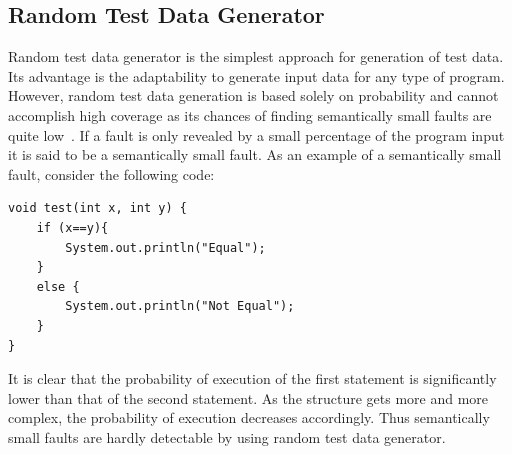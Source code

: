 \subsection{Random Test Data Generator}
\label{sec:randomgenerator_2}
Random test data generator is the simplest approach for generation of test data. Its advantage is the adaptability to generate input data for any type of program. However, random test data generation is based solely on probability and cannot accomplish high coverage as its chances of finding semantically small faults are quite low~\cite{godefroid2005dart}. If a fault is only revealed by a small percentage of the program input it is said to be a semantically small fault. As an example of a semantically small fault, consider the following code:
\bigskip
\begin{lstlisting}
void test(int x, int y) {
    if (x==y){
        System.out.println("Equal");
    }
    else {
        System.out.println("Not Equal");
    }
}
\end{lstlisting}
\bigskip

It is clear that the probability of execution of the first statement is significantly lower than that of the second statement. As the structure gets more and more complex, the probability of execution decreases accordingly. Thus semantically small faults are hardly detectable by using random test data generator. 



